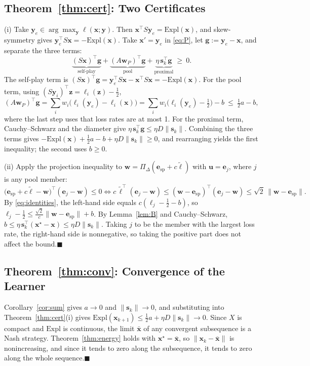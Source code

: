 \documentclass{article}
\theoremstyle{plain}
\theoremstyle{remark}
\newcommand{\Expl}{\mathrm{Expl}}
\newcommand{\Proj}{\Pi}
\newcommand{\simplex}{\Delta}
\newcommand{\bx}{{\bm{x}}}
\newcommand{\by}{{\bm{y}}}
\newcommand{\bw}{{\bm{w}}}
\newcommand{\bz}{{\bm{z}}}
\newcommand{\bu}{{\bm{u}}}
\newcommand{\bg}{{\bm{g}}}
\newcommand{\be}{{\bm{e}}}
\newcommand{\bell}{{\bm{\ell}}}
\newcommand{\aug}{\tilde{\bell}}
\newcommand{\xs}{\bx^{\star}}
\newcommand{\dx}{{\bm{s}}}
\newcommand{\esp}{\be_{\mathrm{sp}}}
\begin{document}
\subsection{Theorem~\ref{thm:cert}: Two Certificates}
\label{app:cert}

(i) Take $\by_e\in\arg\max_\by\ell(\bx;\by)$. Then $\bx^\top S\by_e=\Expl(\bx)$, and skew-symmetry gives $\by_e^\top S\bx=-\Expl(\bx)$. Take $\bx'=\by_e$ in \eqref{eq:P}, let $\bg:=\by_e-\bx$, and separate the three terms:
\[
\underbrace{(S\bx)^\top \bg}_{\text{self-play}}+\underbrace{(A\bw_P)^\top \bg}_{\text{pool}}+\underbrace{\eta\,\dx_k^\top \bg}_{\text{proximal}}\ \ge\ 0 .
\]
The self-play term is $(S\bx)^\top \bg=\by_e^\top S\bx-\bx^\top S\bx=-\Expl(\bx)$. For the pool term, using $(S\by_i)^\top \bz=\ell_i(\bz)-\tfrac12$,
\[
(A\bw_P)^\top \bg=\sum_iw_i\big(\ell_i(\by_e)-\ell_i(\bx)\big)=\sum_iw_i\big(\ell_i(\by_e)-\tfrac12\big)-b\ \le\ \tfrac12a-b ,
\]
where the last step uses that loss rates are at most 1. For the proximal term, Cauchy--Schwarz and the diameter give $\eta\,\dx_k^\top \bg\le\eta D\|\dx_k\|$. Combining the three terms gives $-\Expl(\bx)+\tfrac12a-b+\eta D\|\dx_k\|\ge0$, and rearranging yields the first inequality; the second uses $b\ge0$.

(ii) Apply the projection inequality to $\bw=\Proj_\simplex(\esp+c\aug)$ with $\bu=\be_j$, where $j$ is any pool member:
\[
\big(\esp+c\aug-\bw\big)^\top(\be_j-\bw)\le0\iff c\,\aug^\top(\be_j-\bw)\le(\bw-\esp)^\top(\be_j-\bw)\le\sqrt2\,\|\bw-\esp\| .
\]
By \eqref{eq:identities}, the left-hand side equals $c(\ell_j-\tfrac12-b)$, so $\ell_j-\tfrac12\le\frac{\sqrt2}c\|\bw-\esp\|+b$. By Lemma~\ref{lem:B} and Cauchy--Schwarz, $b\le\eta\,\dx_k^\top(\xs-\bx)\le\eta D\|\dx_k\|$. Taking $j$ to be the member with the largest loss rate, the right-hand side is nonnegative, so taking the positive part does not affect the bound.\hfill$\blacksquare$

\subsection{Theorem~\ref{thm:conv}: Convergence of the Learner}
\label{app:conv}

Corollary~\ref{cor:sum} gives $a\to0$ and $\|\dx_k\|\to0$, and substituting into Theorem~\ref{thm:cert}(i) gives $\Expl(\bx_{k+1})\le\tfrac12a+\eta D\|\dx_k\|\to0$. Since $X$ is compact and $\Expl$ is continuous, the limit $\bar \bx$ of any convergent subsequence is a Nash strategy. Theorem~\ref{thm:energy} holds with $\xs=\bar \bx$, so $\|\bx_k-\bar \bx\|$ is nonincreasing, and since it tends to zero along the subsequence, it tends to zero along the whole sequence.\hfill$\blacksquare$
\end{document}
